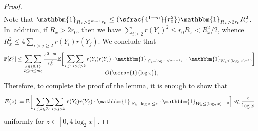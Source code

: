 \documentclass[JEP,XML,SOM,Unicode,published]{cedram}
\newcommand{\Psfrac}[2]{(\sfrac{#1}{#2})}
\newcommand{\ZZ}{\mathbb{Z}}
\newcommand{\PP}{\mathbb{P}}
\newcommand{\EE}{\mathbb{E}}
\newcommand{\one}{\mathbbm{1}}
\newcommand{\EC}{\mathcal{E}}
\newcommand{\bg}{\big}
\newcommand{\bgg}{\Big}
\newcommand{\bggg}{\bigg}
\theoremstyle{plain}
\theoremstyle{definition}
\begin{document}
\begin{proof}
\begin{multline*}
\end{multline*}
Note that $\one_{R_x > 2^{m-1}r_0}\le \Psfrac{4^{1-m}}{r_0^2} \one_{R_x>2r_0}R_x^2$. In~addition, if $R_x>2r_0$, then we have $\sum_{i\ge2}r(Y_i)^2\le r_0R_x<R_x^2/2$, whence $R_x^2\le 4\sum_{i>j\ge2}r(Y_i)r(Y_j)$.
We conclude that
\begin{multline*}
\PP[\EC_1^c]\le \mathop{\sum\sum}_{\substack{k\in\{0,1\} \\ 2\le m\le m_0} }
\frac{4^{2-m}}{r_0^2} \EE\bggg[ \mathop{\sum\sum}_{i,j :\ i>j>k}r(Y_i)r(Y_j) \cdot \one_{|S_k-\log x|\le 2^{m+1}r_0} \cdot \one_{W_k \le (\log_2x)^{-10}} \bggg] \\[-10pt]
+O\bg(\sfrac{1}{\log x}\bg),
\end{multline*}
Therefore, to complete the proof of the lemma, it is enough to show that
\begin{equation}
\label{eq:E(z)}
E(z) \coloneqq \EE \bggg[\mathop{\sum\sum\sum}_{\substack{i, j, k \in \ZZ:\ i>j>k}}r(Y_i)r(Y_j) \cdot \one_{|S_k-\log x|\le z} \cdot \one_{W_k \le (\log_2x)^{-10}} \bgg] \ll \frac{z}{\log x}
\end{equation}
uniformly for $z\in[0,4\log_2x]$.


\end{proof}
\end{document}
